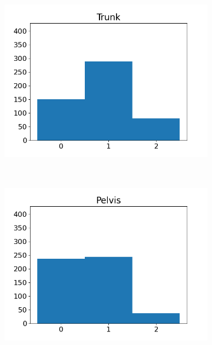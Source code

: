 \begin{figure}
  \centering
  \begin{subfigure}[t]{0.4\textwidth}
    \includegraphics[width=\textwidth]{files/figs/met/trunk-label-hist.png}
    \caption{}
    \label{fig:trunk-labels}
  \end{subfigure}
  ~
  \begin{subfigure}[t]{0.4\textwidth}
    \includegraphics[width=\textwidth]{files/figs/met/pelvis-label-hist.png}
    \caption{}
    \label{fig:pelvis-labels}
  \end{subfigure}
  \begin{subfigure}[t]{0.4\textwidth}

\end{subfigure}
\end{figure}

